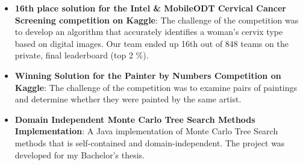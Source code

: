 \documentclass[letterpaper,11pt]{article}
\newcommand{\resumeItem}[2]{
  \item\small{
    \textbf{#1}{: #2 \vspace{-2pt}}
  }
}
\newcommand{\resumeSubItem}[2]{\resumeItem{#1}{#2}\vspace{-4pt}}
\newcommand{\resumeSubHeadingListStart}{\begin{itemize}[leftmargin=*]}
\newcommand{\resumeSubHeadingListEnd}{\end{itemize}}
\begin{document}
  \resumeSubHeadingListStart
    \resumeSubItem{16th place solution for the Intel \& MobileODT Cervical Cancer Screening competition on Kaggle}
      {The challenge of the competition was to develop an algorithm that accurately identifies a woman’s cervix type based on digital images. Our team ended up 16th out of 848 teams on the private, final leaderboard (top 2 \%).}
  \resumeSubHeadingListEnd

  \resumeSubHeadingListStart
    \resumeSubItem{Winning Solution for the Painter by Numbers Competition on Kaggle}
      {The challenge of the competition was to examine pairs of paintings and determine whether they were painted by the same artist.}
  \resumeSubHeadingListEnd

  \resumeSubHeadingListStart
    \resumeSubItem{Domain Independent Monte Carlo Tree Search Methods Implementation}
      {A Java implementation of Monte Carlo Tree Search methods that is self-contained and domain-independent. The project was developed for my Bachelor’s thesis.}
  \resumeSubHeadingListEnd


\end{document}
